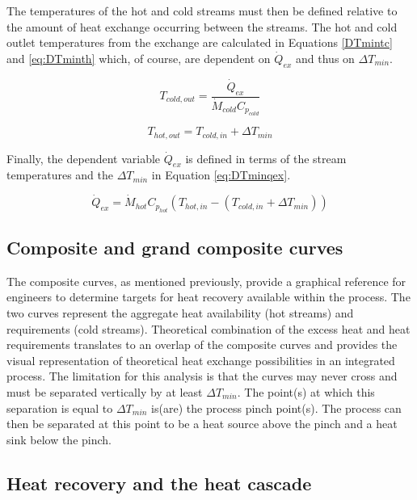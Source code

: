 The temperatures of the hot and cold streams must then be defined relative to the amount of heat exchange occurring between the streams. The hot and cold outlet temperatures from the exchange are calculated in Equations \ref{DTmintc} and \ref{eq:DTminth} which, of course, are dependent on $\dot Q_{ex}$ and thus on $\Delta T_{min}$.

\begin{equation}\label{eq:DTmintc}
T_{cold,out}=\frac{\dot Q_{ex}}{\dot M_{cold}C_{p_{cold}}}
\end{equation}

\begin{equation}\label{eq:DTminth}
T_{hot,out}=T_{cold,in}+\Delta T_{min}
\end{equation}

Finally, the dependent variable $\dot Q_{ex}$ is defined in terms of the stream temperatures and the $\Delta T_{min}$ in Equation \ref{eq:DTminqex}.

\begin{equation}\label{eq:DTminqex}
\dot Q_{ex} = \dot M_{hot}C_{p_{hot}}(T_{hot,in}-(T_{cold,in}+\Delta T_{min}))
\end{equation}

\subsection{Composite and grand composite curves}\label{sec:ccs}

The composite curves, as mentioned previously, provide a graphical reference for engineers to determine targets for heat recovery available within the process. The two curves represent the aggregate heat availability (hot streams) and requirements (cold streams). Theoretical combination of the excess heat and heat requirements translates to an overlap of the composite curves and provides the visual representation of theoretical heat exchange possibilities in an integrated process. The limitation for this analysis is that the curves may never cross and must be separated vertically by at least $\Delta T_{min}$. The point(s) at which this separation is equal to $\Delta T_{min}$ is(are) the process pinch point(s). The process can then be separated at this point to be a heat source above the pinch and a heat sink below the pinch.  

\subsection{Heat recovery and the heat cascade}\label{sec:cascade}